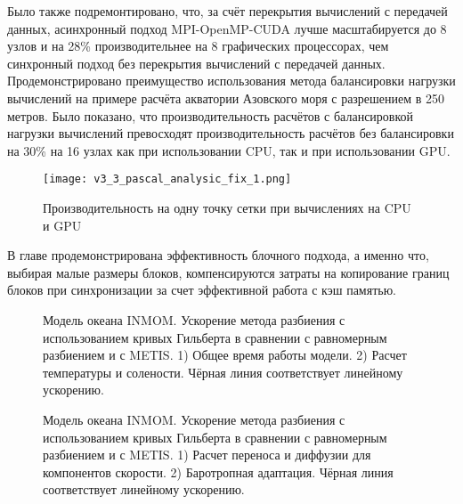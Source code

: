 Было также подремонтировано, что, за счёт перекрытия вычислений с передачей данных, асинхронный подход MPI-OpenMP-CUDA лучше масштабируется до 8 узлов и на 28\% производительнее на 8 графических процессорах, чем синхронный подход без перекрытия вычислений с передачей данных. Продемонстрировано преимущество использования метода балансировки нагрузки вычислений на примере расчёта акватории Азовского моря с разрешением в 250 метров. Было показано, что производительность расчётов с балансировкой нагрузки вычислений превосходят производительность расчётов без балансировки на 30\% на 16 узлах как при использовании CPU, так и при использовании GPU.

\begin{figure}[!ht]
	\begin{minipage}{1\linewidth}
	\centering
	\texttt{[image: v3\_3\_pascal\_analysic\_fix\_1.png]}
	\end{minipage}
	\vspace{3pt}
	\caption{Производительность на одну точку сетки при вычислениях на CPU и GPU}
	\label{fig:TheBox_full}
\end{figure}

В главе продемонстрирована эффективность блочного подхода, а именно что,
выбирая малые размеры блоков, компенсируются затраты на копирование границ блоков при синхронизации за счет эффективной работа с кэш памя­тью.

	\begin{figure}[htb!]
    \begin{minipage}[h]{0.48\linewidth}
    \end{minipage}
    \hfill
    \begin{minipage}[h]{0.48\linewidth}
    \end{minipage}
    \caption{Модель океана INMOM. Ускорение метода разбиения с использованием кривых Гильберта в сравнении с равномерным разбиением и с METIS. 1) Общее время работы модели. 2) Расчет температуры и солености. 
    Чёрная линия соответствует линейному ускорению.}
    \label{fig:inmom_hilbert1}
    \end{figure}
    
     \begin{figure}[htb!]
    \begin{minipage}[h]{0.48\linewidth}
    \end{minipage}
    \hfill
    \begin{minipage}[h]{0.48\linewidth}
    \end{minipage}
    \caption{Модель океана INMOM. Ускорение метода разбиения с использованием кривых Гильберта в сравнении с равномерным разбиением и с METIS. 1) Расчет переноса и диффузии для компонентов скорости. 2) Баротропная адаптация. 
    Чёрная линия соответствует линейному ускорению.}
    \label{fig:inmom_hilbert2}
    \end{figure}
    

